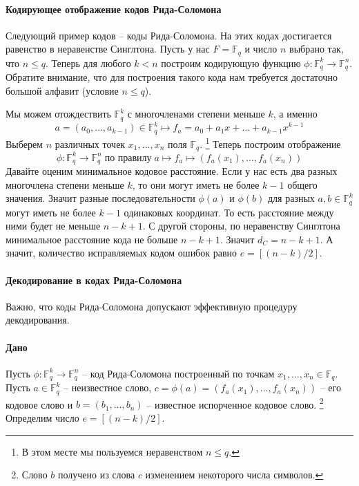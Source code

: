 \paragraph{Кодирующее отображение кодов Рида-Соломона}

Следующий пример кодов -- коды Рида-Соломона.
На этих кодах достигается равенство в неравенстве Синглтона.
Пусть у нас $F = \mathbb F_q$ и число $n$ выбрано так, что $n \leqslant q$.
Теперь для любого $k < n$ построим кодирующую функцию $\phi\colon \mathbb F_q^k \to \mathbb F_q^n$.
Обратите внимание, что для построения такого кода нам требуется достаточно большой алфавит (условие $n \leqslant q$).

Мы можем отождествить $\mathbb F_q^k$ с многочленами степени меньше $k$, а именно
\[
a = (a_0,\ldots,a_{k-1})\in \mathbb F_q^k \mapsto f_a = a_0 + a_1 x + \ldots + a_{k-1}x^{k-1}
\]
Выберем $n$ различных точек $x_1,\ldots, x_n$ поля $\mathbb F_q$.%
\footnote{В этом месте мы пользуемся неравенством $n \leqslant q$.}
Теперь построим отображение
\[
\phi \colon \mathbb F_q^k \to \mathbb F_q^n\;\text{по правилу}\; a \mapsto f_a\mapsto (f_a(x_1),\ldots,f_a(x_n))
\]
Давайте оценим минимальное кодовое расстояние.
Если у нас есть два разных многочлена степени меньше $k$, то они могут иметь не более $k-1$ общего значения.
Значит разные последовательности $\phi(a)$ и $\phi(b)$ для разных $a,b\in \mathbb F_q^k$ могут иметь не более $k-1$ одинаковых координат.
То есть расстояние между ними будет не меньше $n - k + 1$.
С другой стороны, по неравенству Синглтона минимальное расстояние кода не больше $n - k + 1$.
Значит $d_C = n - k + 1$.
А значит, количество исправляемых кодом ошибок равно $e = [(n - k)/2]$.

\paragraph{Декодирование в кодах Рида-Соломона}

Важно, что коды Рида-Соломона допускают эффективную процедуру декодирования.

\paragraph{Дано}

Пусть $\phi\colon \mathbb F_q^k\to \mathbb F_q^n$ -- код Рида-Соломона построенный по точкам $x_1,\ldots, x_n\in \mathbb F_q$.
Пусть $a\in \mathbb F_q^k$ -- неизвестное слово, $c =\phi(a)= (f_a(x_1),\ldots,f_a(x_n))$ -- его кодовое слово и $b = (b_1,\ldots,b_n)$ -- известное испорченное кодовое слово.%
\footnote{Слово $b$ получено из слова $c$ изменением некоторого числа символов.}
Определим число $e = [(n - k)/2]$.

